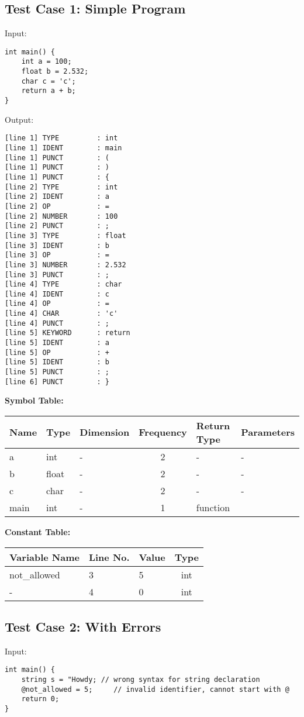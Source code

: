 \documentclass[12pt]{article}
\begin{document}
\subsection{Test Case 1: Simple Program}
Input:
\begin{verbatim}
int main() {
    int a = 100;
    float b = 2.532;
    char c = 'c';
    return a + b;
}
\end{verbatim}
Output:
\begin{lstlisting}[basicstyle=\ttfamily\small]
[line 1] TYPE         : int
[line 1] IDENT        : main
[line 1] PUNCT        : (
[line 1] PUNCT        : )
[line 1] PUNCT        : {
[line 2] TYPE         : int
[line 2] IDENT        : a
[line 2] OP           : =
[line 2] NUMBER       : 100
[line 2] PUNCT        : ;
[line 3] TYPE         : float
[line 3] IDENT        : b
[line 3] OP           : =
[line 3] NUMBER       : 2.532
[line 3] PUNCT        : ;
[line 4] TYPE         : char
[line 4] IDENT        : c
[line 4] OP           : =
[line 4] CHAR         : 'c'
[line 4] PUNCT        : ;
[line 5] KEYWORD      : return
[line 5] IDENT        : a
[line 5] OP           : +
[line 5] IDENT        : b
[line 5] PUNCT        : ;
[line 6] PUNCT        : }
\end{lstlisting}
\vspace{3em}
\bigskip
\textbf{Symbol Table:}
\begin{center}
\begin{tabular}{|l|l|l|c|l|l|}
\hline
Name & Type & Dimension & Frequency & Return Type & Parameters \\
\hline
a    & int   & -  & 2 & - & - \\
b    & float & -  & 2 & - & - \\
c    & char  & -  & 2 & - & - \\
main & int   & - & 1 & function &  \\
\hline
\end{tabular}
\end{center}

\bigskip
\textbf{Constant Table:}
\begin{center}
\begin{tabular}{|l|l|l|c|}
\hline
Variable Name & Line No. & Value  & Type \\
\hline
not\_allowed & 3  & 5   & int \\
- & 4 & 0 & int \\
\hline
\end{tabular}
\end{center}

\subsection{Test Case 2: With Errors}
Input:
\begin{verbatim}
int main() {
    string s = "Howdy; // wrong syntax for string declaration
    @not_allowed = 5;     // invalid identifier, cannot start with @
    return 0;
}
\end{verbatim}
\end{document}
